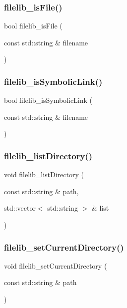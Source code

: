 \subsubsection{\texorpdfstring{filelib\+\_\+is\+File()}{filelib\_isFile()}}
{\footnotesize\ttfamily bool filelib\+\_\+is\+File (\begin{DoxyParamCaption}\item[{const std\+::string \&}]{filename }\end{DoxyParamCaption})}

\mbox{\label{namespaceplatform_a69dc63b6fb991650c05dde15b04ca465}} 
\subsubsection{\texorpdfstring{filelib\+\_\+is\+Symbolic\+Link()}{filelib\_isSymbolicLink()}}
{\footnotesize\ttfamily bool filelib\+\_\+is\+Symbolic\+Link (\begin{DoxyParamCaption}\item[{const std\+::string \&}]{filename }\end{DoxyParamCaption})}

\mbox{\label{namespaceplatform_acad9142fb05b5756d75b8f8a68b5558b}} 
\subsubsection{\texorpdfstring{filelib\+\_\+list\+Directory()}{filelib\_listDirectory()}}
{\footnotesize\ttfamily void filelib\+\_\+list\+Directory (\begin{DoxyParamCaption}\item[{const std\+::string \&}]{path,  }\item[{std\+::vector$<$ std\+::string $>$ \&}]{list }\end{DoxyParamCaption})}

\mbox{\label{namespaceplatform_afe79a966d14e3b8d08939712884fa9d3}} 
\subsubsection{\texorpdfstring{filelib\+\_\+set\+Current\+Directory()}{filelib\_setCurrentDirectory()}}
{\footnotesize\ttfamily void filelib\+\_\+set\+Current\+Directory (\begin{DoxyParamCaption}\item[{const std\+::string \&}]{path }\end{DoxyParamCaption})}

